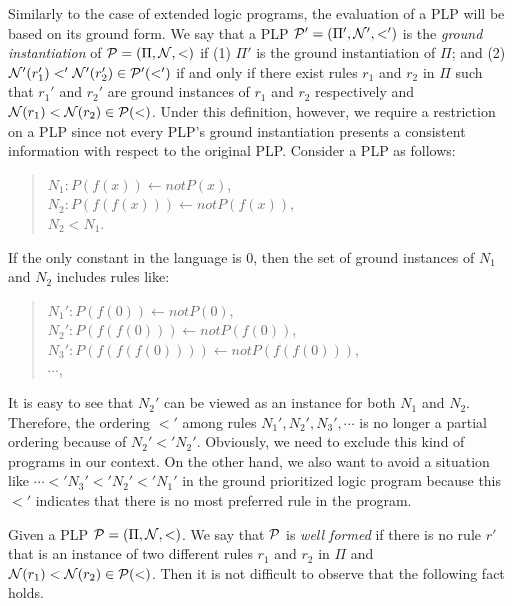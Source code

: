 \documentclass{tlp}
\begin{document}
Similarly to the case of extended logic programs, 
the evaluation of a PLP will be based on its ground form. 
We say that a PLP ${\cal P'}=(\Pi',{\cal N'},<')$ is the
{\em ground instantiation} of ${\cal P}=(\Pi,{\cal N},<)$ if 
(1) $\Pi'$ is the ground instantiation of $\Pi$; and (2) 
${\cal N'}(r_1')<' {\cal N'}(r_2')\in {\cal P'}(<')$ if and only
if there exist rules $r_1$ and $r_2$ in $\Pi$ such that
$r_1'$ and $r_2'$ are ground instances of $r_1$ and $r_2$ respectively and
${\cal N}(r_1) < {\cal N}(r_2)\in {\cal P}(<)$.
Under this definition, 
however, we require a restriction on a PLP since
not every PLP's ground instantiation presents a consistent
information with respect to the original PLP.
Consider a PLP as follows:
\begin{quote}
$N_{1}: P(f(x))\leftarrow not P(x)$,\\
\hspace*{.1in} $N_{2}: P(f(f(x)))\leftarrow not P(f(x))$,\\
\hspace*{.1in} $N_{2}<N_{1}$.
\end{quote}
If the only constant in the language is $0$, then the set of ground
instances of $N_{1}$ and $N_{2}$ includes rules like:
\begin{quote}
$N_{1}': P(f(0))\leftarrow not P(0)$,\\
\hspace*{.1in} $N_{2}': P(f(f(0)))\leftarrow not P(f(0))$,\\
\hspace*{.1in} $N_{3}': P(f(f(f(0))))\leftarrow not P(f(f(0)))$,\\
\hspace*{.1in} $\cdots$,
\end{quote}
It is easy to see that $N_{2}'$ can be viewed as an
instance for both $N_{1}$ and $N_{2}$. Therefore, the ordering $<'$
among rules $N_1', N_2',N_3',\cdots$
is no longer a partial ordering because of
$N_{2}'<'N_{2}'$.
Obviously, we need to exclude this kind of programs in our context.
On the other hand,
we also want to avoid a situation like
$\cdots <'N_{3}'<'N_{2}'<'N_{1}'$ in the ground
prioritized logic program because this $<'$ indicates that
there is no most preferred rule in the program.

Given a PLP ${\cal P}=(\Pi, {\cal N}, <)$. We say that
${\cal P}$ is {\em well formed} if
there is no rule $r'$ that is an instance of two different rules
$r_{1}$ and $r_{2}$ in $\Pi$ and
${\cal N}(r_{1})<{\cal N}(r_{2}) \in {\cal P}(<)$.
Then it is not difficult to observe that
the following fact holds.
\end{document}
